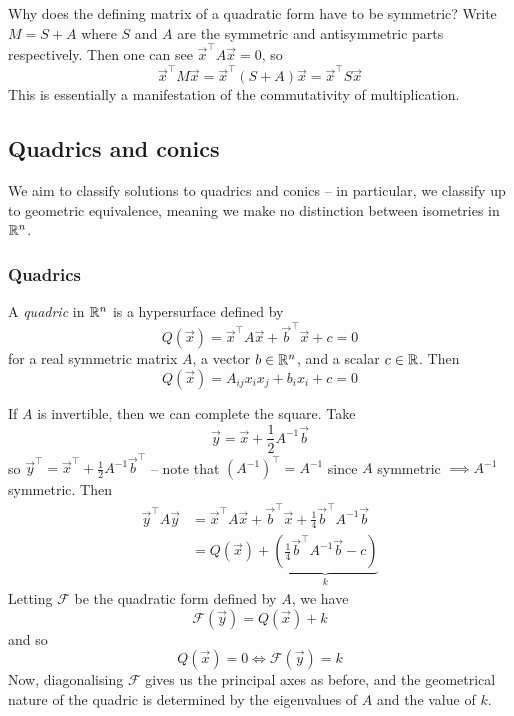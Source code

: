 \documentclass{../../template/note}
\begin{document}
    \begin{remark}
        Why does the defining matrix of a quadratic form have to be symmetric? Write \(M = S + A\) where \(S\) and \(A\) are the symmetric and antisymmetric parts respectively. Then one can see \(\vec x^\intercal A \vec x = 0\), so
        \[
            \vec x^\intercal M \vec x = \vec x^\intercal (S + A) \vec x = \vec x^\intercal S \vec x
        \]
        This is essentially a manifestation of the commutativity of multiplication.
    \end{remark}
    
    \subsection{Quadrics and conics}

    We aim to classify solutions to quadrics and conics -- in particular, we classify up to geometric equivalence, meaning we make no distinction between isometries in \(\mathbb R^n\).

    \subsubsection{Quadrics}

    \begin{definition}
        A \emph{quadric} in \(\mathbb R^n\) is a hypersurface defined by
        \[
            Q(\vec x) = \vec x^\intercal A \vec x + \vec b^\intercal \vec x + c = 0
        \]
        for a real symmetric matrix \(A\), a vector \(b \in \mathbb R^n\), and a scalar \(c \in \mathbb R\). Then
        \[
            Q(\vec x) = A_{ij}x_ix_j + b_ix_i + c = 0
        \]
    \end{definition}
    If \(A\) is invertible, then we can complete the square. Take
    \[
        \vec y = \vec x + \frac 1 2 A^{-1} \vec b
    \]
    so \(\vec y^\intercal = \vec x^\intercal + \frac 1 2 A^{-1} \vec b^\intercal\) -- note that \((A^{-1})^\intercal = A^{-1}\) since \(A\) symmetric \(\implies A^{-1}\) symmetric. Then
    \begin{align*}
        \vec y^\intercal A \vec y &= \vec x^\intercal A \vec x + \vec b^\intercal \vec x + \frac{1}{4} \vec b^\intercal A^{-1} \vec b \\
        &= Q(\vec x) + \underbrace{\left(\frac{1}{4} \vec b^\intercal A^{-1} \vec b - c\right)}_k
    \end{align*}
    Letting \(\mathcal F\) be the quadratic form defined by \(A\), we have
    \[
        \mathcal F(\vec y) = Q(\vec x) + k 
    \]
    and so
    \[
        Q(\vec x) = 0 \iff \mathcal F(\vec y) = k
    \]
    Now, diagonalising \(\mathcal F\) gives us the principal axes as before, and the geometrical nature of the quadric is determined by the eigenvalues of \(A\) and the value of \(k\).
\end{document}
